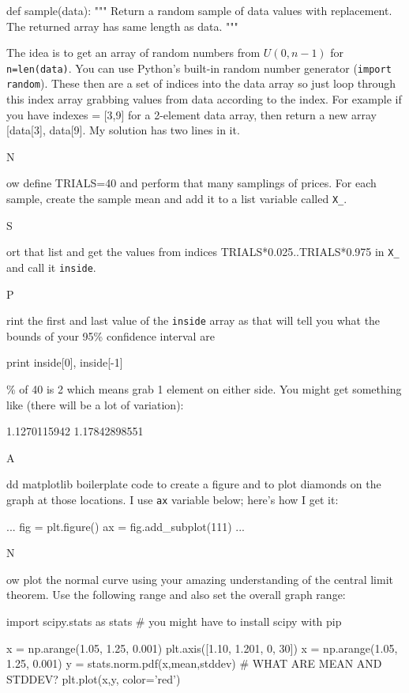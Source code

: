 \documentclass[titlepage]{tufte-book}
\newcounter{problem}
\newcommand{\step}[1]{{}
\vspace{4pt} \noindent {\bf \theproblem. }#1\addtocounter{problem}{1}}
\begin{document}
\begin{fullwidth}
\begin{pyverbatim}
def sample(data):
	"""
	Return a random sample of data values with replacement.
	The returned array has same length as data.
	"""
\end{pyverbatim}

The idea is to get an array of random numbers from $U(0,n-1)$ for {\tt n=len(data)}. You can use Python's built-in random number generator ({\tt import random}). These then are a set of indices into the data array so just loop through this index array grabbing values from data according to the index. For example if you have indexes = [3,9] for a 2-element data array, then return a new array [data[3], data[9]. My solution has two lines in it.

\step Now define TRIALS=40 and perform that many samplings of prices. For each sample, create the sample mean and add it to a list variable called {\tt X\_}.

\step Sort that list and get the values from indices TRIALS*0.025..TRIALS*0.975 in {\tt X\_} and call it {\tt inside}.

\step Print the first and last value of the {\tt inside} array as that will tell you what the bounds of your 95\% confidence interval are

\begin{pyverbatim}
print inside[0], inside[-1]
\end{pyverbatim}

\% of 40 is 2 which means grab 1 element on either side. You might get something like (there will be a lot of variation):

1.1270115942 1.17842898551

\step Add matplotlib boilerplate code to create a figure and to plot diamonds on the graph at those locations.  I use {\tt ax} variable below; here's how I get it:

\begin{pyverbatim}
...
fig = plt.figure()
ax = fig.add_subplot(111)
...
\end{pyverbatim}


\step Now plot the normal curve using your amazing understanding of the central limit  theorem. Use the following range and also set the overall graph range:

\begin{pyverbatim}
import scipy.stats as stats # you might have to install scipy with pip

x = np.arange(1.05, 1.25, 0.001)
plt.axis([1.10, 1.201, 0, 30])
x = np.arange(1.05, 1.25, 0.001)
y = stats.norm.pdf(x,mean,stddev)  # WHAT ARE MEAN AND STDDEV?
plt.plot(x,y, color='red')
\end{pyverbatim}


\end{fullwidth}
\end{document}
